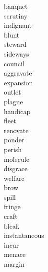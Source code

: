 \documentclass[a4paper, 11pt]{ctexart}
\begin{document}
\begin{multicols*}{3}
\begin{description}
\item[banquet]

\item[scrutiny]

\item[indignant]

\item[blunt]

\item[steward]

\item[sideways]

\item[council]

\item[aggravate]

\item[expansion]

\item[outlet]

\item[plague]

\item[handicap]

\item[fleet]

\item[renovate]

\item[ponder]

\item[perish]

\item[molecule]

\item[disgrace]

\item[welfare]

\item[brow]

\item[spill]

\item[fringe]

\item[craft]

\item[bleak]

\item[instantaneous]

\item[incur]

\item[menace]

\item[margin]


\end{description}
\end{multicols*}
\end{document}
